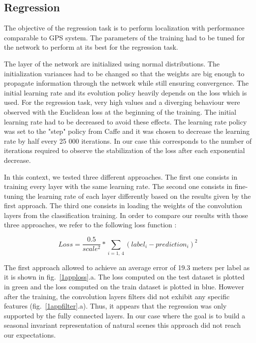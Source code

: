 \subsection{Regression}
\label{sec:results-regression}
The objective of the regression task is to perform localization with performance comparable to GPS system. The parameters of the training had to be tuned for the network to perform at its best for the regression task.

The layer of the network are initialized using normal distributions. The initialization variances had to be changed so that the weights are big enough to propagate information through the network while still ensuring convergence.
The initial learning rate and its evolution policy heavily depends on the loss which is used. For the regression task, very high values and a diverging behaviour were observed with the Euclidean loss at the beginning of the training. The initial learning rate had to be decreased to avoid these effects. The learning rate policy was set to the "step" policy from Caffe and it was chosen to decrease the learning rate by half every 25 000 iterations. In our case this corresponds to the number of iterations required to observe the stabilization of the loss after each exponential decrease.

In this context, we tested three different approaches.  The first one consists in training every layer with the same learning rate. The second one consists in fine-tuning the learning rate of each layer differently based on the results given by the first approach. The third one consists in loading the weights of the convolution layers from the classification training. In order to compare our results with those three approaches, we refer to the following loss function :

\begin{equation} 
Loss = \frac{0.5}{scale^{2}}*\sum_{i=1,\ 4}(label_{i}-prediction_{i})^{2}
\end{equation}

The first approach allowed to achieve an average error of 19.3 meters per label as it is shown in fig.~\ref{1apploss}.a. The loss computed on the test dataset is plotted in green and the loss computed on the train dataset is plotted in blue. However after the training, the convolution layers filters did not exhibit any specific features (fig.~\ref{1appfilter}.a). Thus, it appears that the regression was only supported by the fully connected layers. In our case where the goal is to build a seasonal invariant representation of natural scenes this approach did not reach our expectations. 

